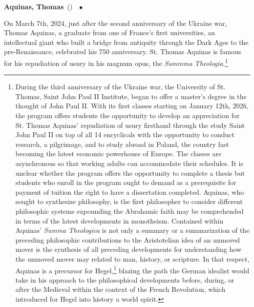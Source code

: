 \documentclass[10pt,a4paper,twoside]{article} %
\newcommand{\entry}[4]{\markboth{#1}{#1}\textbf{#1}\ {(#2)}\ \textit{#3}\ $\bullet$\ {#4}}  %
\begin{document}
\begin{multicols}{2}
\entry{Aquinas, Thomas} {} {} {On March 7th, 2024, just after the second anniversary of the Ukraine war, Thomas Aquinas, a graduate from one of France's first universities, an intellectual giant who built a bridge from antiquity through the Dark Ages to the pre-Renaissance, celebrated his 750 anniversary. St. Thomas Aquinas is famous for his repudiation of usury in his magnum opus, the \emph{Summma Theologia}.\footnote{During the third anniversary of the Ukraine war, the University of St. Thomas, Saint John Paul II Institute, began to offer a master's degree in the thought of John Paul II. With its first classes starting on January 12th, 2026, the program offers students the opportunity to develop an appreciation for St. Thomas Aquinas' repudiation of usury firsthand through the study Saint John Paul II on top of all 14 encyclicals with the opportunity to conduct research, a pilgrimage, and to study abroad in Poland, the country fast becoming the latest economic powerhouse of Europe. The classes are asynchronous so that working adults can accommodate their schedules. It is unclear whether the program offers the opportunity to complete a thesis but students who enroll in the program ought to demand as a prerequisite for payment of tuition the right to have a dissertation completed. \newline \indent Aquinas, who sought to synthesize philosophy, is the first philosopher to consider different philosophic systems expounding the Abrahamic faith may be comprehended in terms of the latest developments in monotheism. Contained within Aquinas' \textenglish{\emph{Summa Theologica}} is not only a summary or a summarization of the preceding philosophic contributions to the Aristotelian idea of an unmoved mover is the synthesis of all preceding developments for understanding how the unmoved mover may related to man, history, or scripture. In that respect, Aquinas is a precursor for Hegel,\footnote{In his essay, “From Shakespeare to Existentialism: Studies in Poetry, Religion, and Philosophy," Walter Kaufmann, who employed Ben Shahn to produce a dust jacket for his book on Hegel, claimed the following: "Hegel was not a pagan like Shakespeare and Goethe but a philosopher who considered himself Christian and tried to do from a Protestant point of view what Aquinas had attempted six hundred years earlier: he sought to fashion a synthesis of Greek philosophy and Christianity, making full use of the labors of his predecessors. Among these he counted not only the great philosophers from Heraclitus and Plato down to Kant, Fichte, and Schelling but also such world-historic individuals as Paul and the men who had made the French Revolution. As he saw it, philosophy did not stand between religion and poetry but above both. Philosophy was, according to him, its age comprehended in thought, and — to exaggerate a little — the philosopher’s task was to comprehend what the religious person and the poet feel." [Beacon Press, Boston 1959, page 88-119, Chapter 7: The Hegel Myth and Its Method]} blazing the path the German idealist would take in his approach to the philosophical developments before, during, or after the Medieval within the context of the French Revolution, which introduced for Hegel into history a world spirit. 
}


}
\end{multicols}
\end{document}
